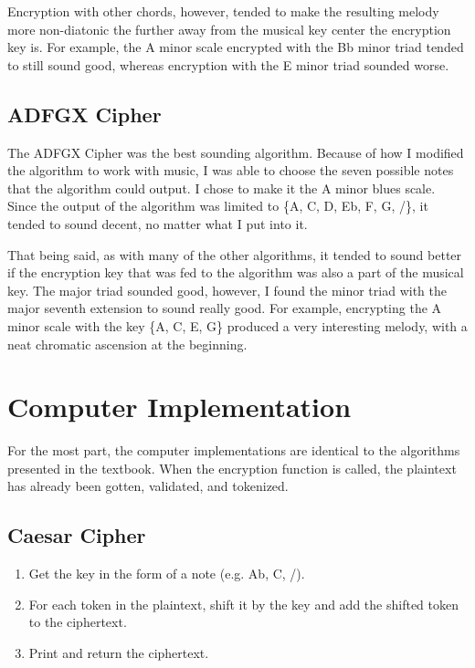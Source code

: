 \documentclass[14pt]{article}
\begin{document}
        Encryption with other chords, however, tended to make the resulting melody more non-diatonic the further away from the musical key center the encryption key is. For example, the A minor scale encrypted with the Bb minor triad tended to still sound good, whereas encryption with the E minor triad sounded worse.

        \subsection{ADFGX Cipher}
        The ADFGX Cipher was the best sounding algorithm. Because of how I modified the algorithm to work with music, I was able to choose the seven possible notes that the algorithm could output. I chose to make it the A minor blues scale. Since the output of the algorithm was limited to \{A, C, D, Eb, F, G, /\}, it tended to sound decent, no matter what I put into it.

        That being said, as with many of the other algorithms, it tended to sound better if the encryption key that was fed to the algorithm was also a part of the musical key. The major triad sounded good, however, I found the minor triad with the major seventh extension to sound really good. For example, encrypting the A minor scale with the key \{A, C, E, G\} produced a very interesting melody, with a neat chromatic ascension at the beginning.
        

	\section{Computer Implementation}
    For the most part, the computer implementations are identical to the algorithms presented in the textbook. When the encryption function is called, the plaintext has already been gotten, validated, and tokenized.
    	\subsection{Caesar Cipher}
        \begin{enumerate}
            \item Get the key in the form of a note (e.g. Ab, C, /).
            \item For each token in the plaintext, shift it by the key and add the shifted token to the ciphertext.
            \item Print and return the ciphertext.
        \end{enumerate}
        
\end{document}
